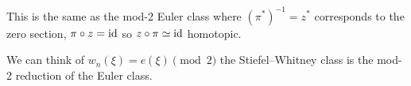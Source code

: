 \begin{remark}
This is the same as the mod-2 Euler class where $(\pi^{*})^{-1}=z^{*}$
corresponds to the zero section, $\pi\circ z=\operatorname{id}$ so
$z\circ\pi\simeq\operatorname{id}$ homotopic.
\end{remark}

\begin{remark}
We can think of $w_{n}(\xi)=e(\xi)\pmod{2}$ the Stiefel--Whitney class
is the mod-2 reduction of the Euler class.
\end{remark}